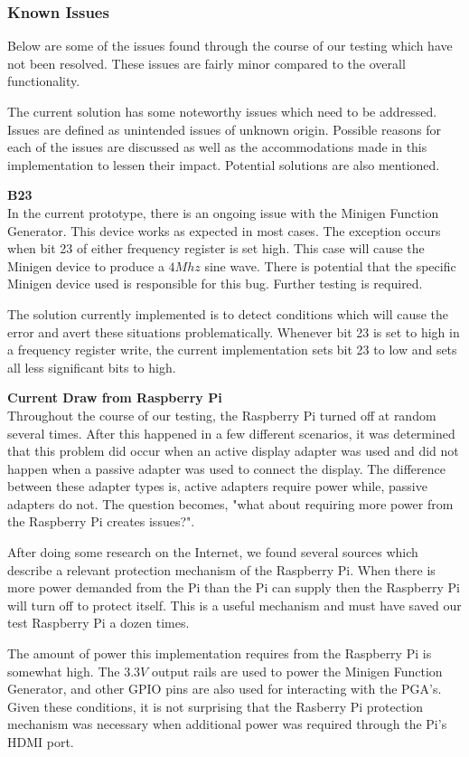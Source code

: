 \documentclass{article}	%
\begin{document}
\begin{multicols}{2}
\subsubsection{Known Issues}
Below are some of the issues found
through the course of our testing
which have not been resolved.
These issues are fairly minor compared
to the overall functionality.

The current solution has some noteworthy issues
which need to be addressed.
Issues are defined as unintended issues of unknown origin.
Possible reasons for each of the issues are discussed as
well as the accommodations made in this implementation to lessen their impact.
Potential solutions are also mentioned.

\textbf{B23}\\
In the current prototype,
there is an ongoing issue with the Minigen Function Generator.
This device works as expected in most cases.
The exception occurs when bit 23 of either frequency register
is set high.
This case will cause the Minigen device to produce a $4Mhz$ sine wave.
There is potential that the specific Minigen device used 
is responsible for this bug.
Further testing is required.

The solution currently implemented is
to detect conditions which will cause the error
and avert these situations problematically.
Whenever bit 23 is set to high in a frequency register write,
the current implementation sets bit 23 to low
and sets all less significant bits to high.

\textbf{Current Draw from Raspberry Pi}\\
Throughout the course of our testing,
the Raspberry Pi turned off at random several times.
After this happened in a few different scenarios,
it was determined that this problem
did occur when an active display adapter was used and
did not happen when a passive adapter was used 
to connect the display.
The difference between these adapter types is,
active adapters require power while,
passive adapters do not.
The question becomes,
"what about requiring more power from the Raspberry Pi creates issues?".

After doing some research on the Internet,
we found several sources which describe 
a relevant protection mechanism of the Raspberry Pi.
When there is more power demanded from the Pi than
the Pi can supply then
the Raspberry Pi will turn off to protect itself.
This is a useful mechanism and must have 
saved our test Raspberry Pi a dozen times.

The amount of power this implementation
requires from the Raspberry Pi is somewhat high.
The $3.3V$ output rails are used to power the
Minigen Function Generator, and
other GPIO pins are also used for interacting
with the PGA's.
Given these conditions,
it is not surprising that the Rasberry Pi 
protection mechanism was necessary
when additional power was required
through the Pi's HDMI port.


\end{multicols}
\end{document}
